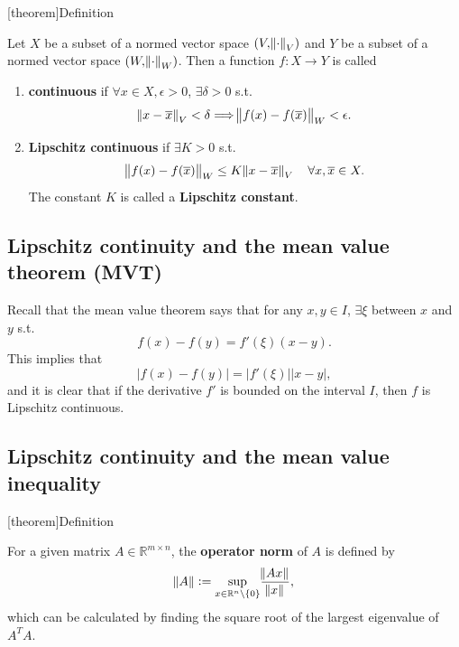 \documentclass[12pt]{report}
\theoremstyle{definition}
\begin{document}
[theorem]{Definition}
\begin{continuous and lipschitz continuous functions}
    Let $X$ be a subset of a normed vector space $(V, \norm{\cdot}_V)$ and $Y$
    be a subset of a normed vector space $(W, \norm{\cdot}_W)$.
    Then a function $f:X\rightarrow Y$ is called
    \begin{enumerate}[label = (\roman*)]
        \item \textbf{continuous} if $\forall x\in X, \epsilon > 0$,
            $\exists \delta>0$ s.t.
            \[
                \norm{x-\overline{x}}_V<\delta \Longrightarrow
                \norm{f(x)-f(\overline{x})}_W < \epsilon.
            \]
        \item \textbf{Lipschitz continuous} if $\exists K>0$ s.t.
            \[
                \norm{f(x)-f(\overline{x})}_W\le K\norm{x-\overline{x}}_V
                \quad\forall x,\overline{x}\in X.
            \]
            The constant $K$ is called a \textbf{Lipschitz constant}.
    \end{enumerate} 
\end{continuous and lipschitz continuous functions}

\subsection{Lipschitz continuity and the mean value theorem (MVT)}

Recall that the mean value theorem says that for any $x,y\in I$,
$\exists \xi$ between $x$ and $y$ s.t.
\[
    f(x)-f(y)=f'(\xi)(x-y).
\]
This implies that
\[
    \left|f(x)-f(y)\right|=|f'(\xi)||x-y|,
\]
and it is clear that if the derivative $f'$ is bounded on the interval $I$,
then $f$ is Lipschitz continuous.

\subsection{Lipschitz continuity and the mean value inequality}

[theorem]{Definition}
\begin{operator norm of a matrix}
    For a given matrix $A\in\mathbb{R}^{m\times n}$,
    the \textbf{operator norm} of $A$ is defined by
    \[
        \norm{A}:= \underset{x\in\mathbb{R}^{n}\backslash\{0\}}{\sup}
        \frac{\norm{Ax}}{\norm{x}},
    \]
    which can be calculated by finding the square root of the largest
    eigenvalue of $A^{T}A$.
\end{operator norm of a matrix}
\end{document}

